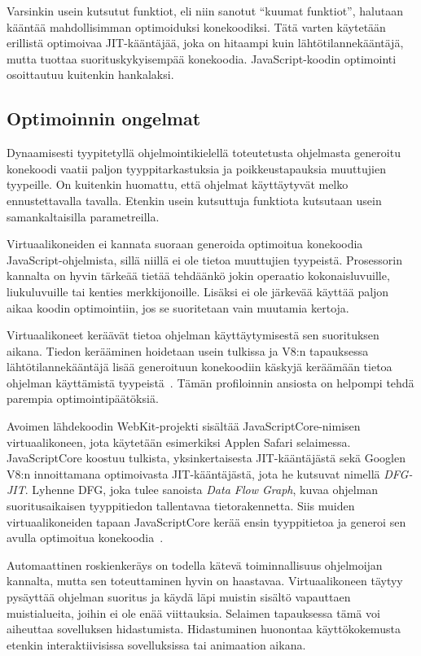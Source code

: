 Varsinkin usein kutsutut funktiot, eli niin sanotut ``kuumat funktiot'', halutaan kääntää mahdollisimman optimoiduksi konekoodiksi. Tätä varten käytetään erillistä optimoivaa JIT-kääntäjää, joka on hitaampi kuin lähtötilannekääntäjä, mutta tuottaa suorituskykyisempää konekoodia. JavaScript-koodin optimointi osoittautuu kuitenkin hankalaksi.

\subsection{Optimoinnin ongelmat}

Dynaamisesti tyypitetyllä ohjelmointikielellä toteutetusta ohjelmasta generoitu konekoodi vaatii paljon tyyppitarkastuksia ja poikkeustapauksia muuttujien tyypeille. On kuitenkin huomattu, että ohjelmat käyttäytyvät melko ennustettavalla tavalla. Etenkin usein kutsuttuja funktiota kutsutaan usein samankaltaisilla parametreilla.

Virtuaalikoneiden ei kannata suoraan generoida optimoitua konekoodia JavaScript-ohjelmista, sillä niillä ei ole tietoa muuttujien tyypeistä. Prosessorin kannalta on hyvin tärkeää tietää tehdäänkö jokin operaatio kokonaisluvuille, liukuluvuille tai kenties merkkijonoille. Lisäksi ei ole järkevää käyttää paljon aikaa koodin optimointiin, jos se suoritetaan vain muutamia kertoja.

Virtuaalikoneet keräävät tietoa ohjelman käyttäytymisestä sen suorituksen aikana. Tiedon kerääminen hoidetaan usein tulkissa ja V8:n tapauksessa lähtötilannekääntäjä lisää generoituun konekoodiin käskyjä keräämään tietoa ohjelman käyttämistä tyypeistä~\cite{v8compilers}. Tämän profiloinnin ansiosta on helpompi tehdä parempia optimointipäätöksiä.

Avoimen lähdekoodin WebKit-projekti sisältää JavaScriptCore-nimisen virtuaalikoneen, jota käytetään esimerkiksi Applen Safari selaimessa. Java\-Script\-Core koostuu tulkista, yksinkertaisesta JIT-kääntäjästä sekä Googlen V8:n innoittamana optimoivasta JIT-kääntäjästä, jota he kutsuvat nimellä \textit{DFG-JIT}. Lyhenne DFG, joka tulee sanoista \textit{Data Flow Graph}, kuvaa ohjelman suoritusaikaisen tyyppitiedon tallentavaa tietorakennetta. Siis muiden virtuaalikoneiden tapaan JavaScriptCore kerää ensin tyyppitietoa ja generoi sen avulla optimoitua konekoodia~\cite{javascriptcore}.

Automaattinen roskienkeräys on todella kätevä toiminnallisuus ohjelmoijan kannalta, mutta sen toteuttaminen hyvin on haastavaa. Virtuaalikoneen täytyy pysäyttää ohjelman suoritus ja käydä läpi muistin sisältö vapauttaen muistialueita, joihin ei ole enää viittauksia. Selaimen tapauksessa tämä voi aiheuttaa sovelluksen hidastumista. Hidastuminen huonontaa käyttökokemusta etenkin interaktiivisissa sovelluksissa tai animaation aikana.
